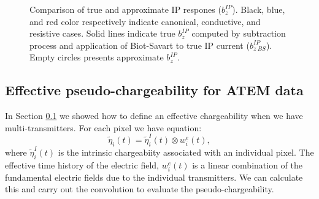 \documentclass[extra,mreferee]{gji}
\newcommand{\peta}{\tilde{\eta}}
\begin{document}
\begin{figure}
  \caption{Comparison of true and approximate IP respones ($b_z^{IP}$). Black, blue, and red color respectively indicate canonical, conductive, and resistive cases. Solid lines indicate true $b_z^{IP}$ computed by subtraction process and application of Biot-Savart to true IP current ($b_{z \ BS}^{IP}$). Empty circles presents approximate $b_z^{IP}$. }
  \label{F:True_vs_approx_IPresp}
\end{figure}
\clearpage


\subsection{Effective pseudo-chargeability for ATEM data}
\label{subsection: Effective pseudo-chargeability for ATEM data}

In Section \ref{subsection: Effective pseudo-chargeability for ATEM data} we showed how to define an effective chargeability when we have multi-transmitters. For each pixel we have
equation: 
\begin{equation}
  \peta_i(t) = \peta_i^I(t) \otimes  w_i^e(t),
\end{equation}
where $\peta_i^I(t)$ is the intrinsic chargeabiity associated with an individual pixel. The effective time history of the electric field, $w_i^e(t)$ is a linear combination of the fundamental electric fields due to the individual transmitters. We can calculate this and carry out the convolution to evaluate the pseudo-chargeability. 
\end{document}
